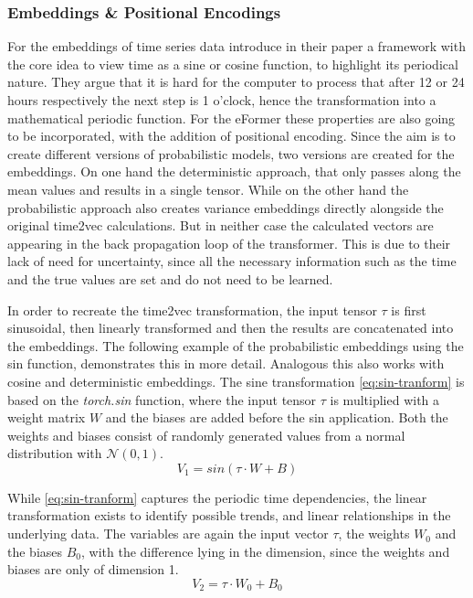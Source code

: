 \documentclass{article}
\begin{document}
\subsubsection{Embeddings \& Positional Encodings}

For the embeddings of time series data \cite{time2vec} introduce in their paper a framework with the core idea to view time as a sine or cosine function, to highlight its periodical nature. They argue that it is hard for the computer to process that after 12 or 24 hours respectively the next step is 1 o'clock, hence the transformation into a mathematical periodic function. For the eFormer these properties are also going to be incorporated, with the addition of positional encoding.
Since the aim is to create different versions of probabilistic models, two versions are created for the embeddings. On one hand the deterministic approach, that only passes along the mean values and results in a single tensor. While on the other hand the probabilistic approach also creates variance embeddings directly alongside the original time2vec calculations. But in neither case the calculated vectors are appearing in the back propagation loop of the transformer. This is due to their lack of need for uncertainty, since all the necessary information such as the time and the true values are set and do not need to be learned. \par 

In order to recreate the time2vec transformation, the input tensor $\tau$ is first sinusoidal, then linearly transformed and then the results are concatenated into the embeddings. The following example of the probabilistic embeddings using the sin function, demonstrates this in more detail. Analogous this also works with cosine and deterministic embeddings.
The sine transformation \eqref{eq:sin-tranform} is based on the \textit{torch.sin} function, where the input tensor $\tau$ is multiplied with a weight matrix $W$ and the biases are added before the sin application. Both the weights and biases consist of randomly generated values from a normal distribution with $\mathcal{N}(0,1)$.
\begin{equation}\label{eq:sin-tranform}
    V_1 = sin(\tau \cdot W + B)
\end{equation}
    
While \eqref{eq:sin-tranform} captures the periodic time dependencies, the linear transformation exists to identify possible trends, and linear relationships in the underlying data. The variables are again the input vector $\tau$, the weights $W_0$ and the biases $B_0$, with the difference lying in the dimension, since the weights and biases are only of dimension 1.    
\begin{equation}\label{eq:lin-tranform}
    V_2 = \tau \cdot W_0 + B_0
\end{equation}
\end{document}
